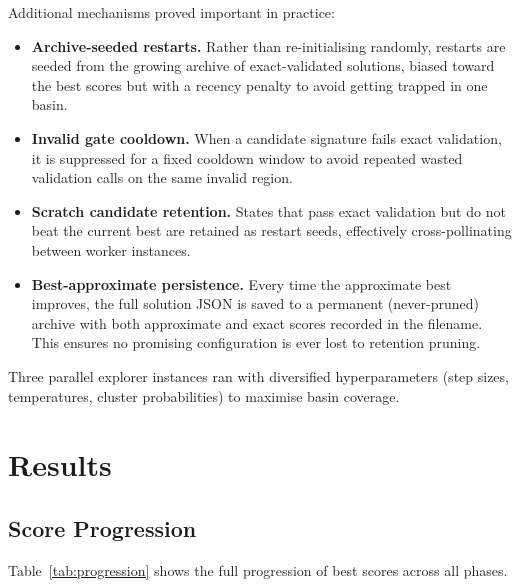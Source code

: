 \documentclass[11pt]{article}
\begin{document}
Additional mechanisms proved important in practice:
\begin{itemize}
  \item \textbf{Archive-seeded restarts.} Rather than re-initialising randomly, restarts are seeded from the growing archive of exact-validated solutions, biased toward the best scores but with a recency penalty to avoid getting trapped in one basin.
  \item \textbf{Invalid gate cooldown.} When a candidate signature fails exact validation, it is suppressed for a fixed cooldown window to avoid repeated wasted validation calls on the same invalid region.
  \item \textbf{Scratch candidate retention.} States that pass exact validation but do not beat the current best are retained as restart seeds, effectively cross-pollinating between worker instances.
  \item \textbf{Best-approximate persistence.} Every time the approximate best improves, the full solution JSON is saved to a permanent (never-pruned) archive with both approximate and exact scores recorded in the filename. This ensures no promising configuration is ever lost to retention pruning.
\end{itemize}

Three parallel explorer instances ran with diversified hyperparameters (step sizes, temperatures, cluster probabilities) to maximise basin coverage.

\section{Results}
\label{sec:results}

\subsection{Score Progression}

Table~\ref{tab:progression} shows the full progression of best scores across all phases.
\end{document}
